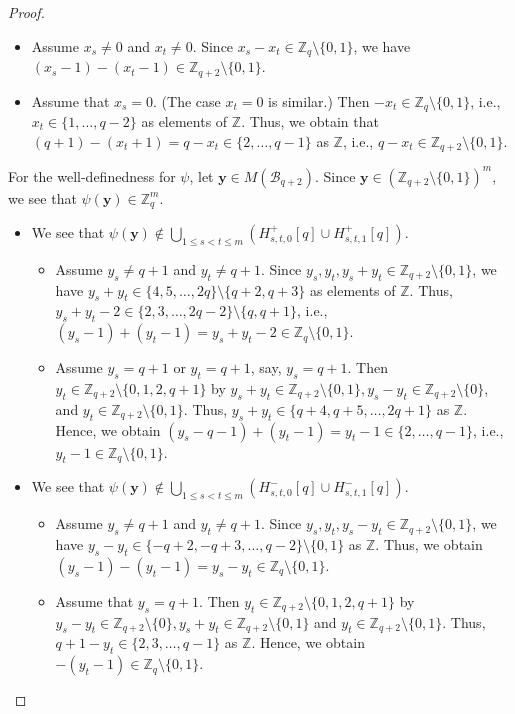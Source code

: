 \documentclass{article}
\theoremstyle{plain}
\theoremstyle{definition}
\theoremstyle{remark}
\numberwithin{equation}{section}
\newcommand{\Bc}{\mathcal{B}}
\newcommand{\ZZ}{\mathbb{Z}}
\begin{document}
\begin{proof}
\begin{itemize}
    \begin{itemize}
        \item Assume $x_s \neq 0$ and $x_t \neq 0$. 
        Since $x_s - x_t \in \ZZ_q \setminus \{0,1\}$, we have $(x_s - 1) - (x_t - 1) \in \ZZ_{q+2} \setminus \{0,1\}$. 
        \item Assume that $x_s = 0$. (The case $x_t=0$ is similar.) 
        Then $-x_t \in \ZZ_q \setminus \{0,1\}$, i.e., $x_t \in \{1,\ldots,q-2\}$ as elements of $\ZZ$. 
        Thus, we obtain that $(q+1) - (x_t + 1) = q - x_t \in \{2,\ldots,q-1\}$ as $\ZZ$, i.e., $q-x_t \in \ZZ_{q+2} \setminus \{0,1\}$.  
    \end{itemize}
\end{itemize}

\medskip

\noindent
For the well-definedness for $\psi$, let $\bm{y} \in M(\Bc_{q+2})$.
Since $\bm{y} \in (\ZZ_{q+2} \setminus \{0,1\})^m$, we see that $\psi(\bm{y}) \in \ZZ_q^m$.   
\begin{itemize}
\item We see that $\psi(\bm{y}) \notin \bigcup_{1 \leq s<t \leq m}(H_{s,t,0}^+[q] \cup H_{s,t,1}^+[q])$.
    \begin{itemize}
        \item Assume $y_s \neq q+1$ and $y_t \neq q+1$. Since $y_s,y_t,y_s+y_t \in \ZZ_{q+2} \setminus \{0,1\}$, 
        we have $y_s + y_t \in \{4,5,\ldots,2q\} \setminus \{q+2,q+3\}$ as elements of $\ZZ$. 
        Thus, $y_s + y_t - 2 \in \{2,3,\ldots,2q-2\} \setminus \{q,q+1\}$, i.e., $(y_s-1)+(y_t-1)=y_s + y_t - 2 \in \ZZ_q \setminus \{0,1\}$. 
        \item Assume $y_s=q+1$ or $y_t=q+1$, say, $y_s=q + 1$. Then $y_t \in \ZZ_{q+2} \setminus \{0,1,2,q+1\}$ by $y_s+y_t \in \ZZ_{q+2} \setminus \{0,1\}, y_s - y_t \in \ZZ_{q+2} \setminus \{0\}$, and $y_t \in \ZZ_{q+2} \setminus \{0,1\}$. 
        Thus, $y_s + y_t \in \{q+4,q+5,\ldots,2q+1\}$ as $\ZZ$. Hence, we obtain $(y_s-q-1)+(y_t - 1)=y_t-1 \in \{2,\ldots,q-1\}$, 
        i.e., $y_t-1 \in \ZZ_q \setminus \{0,1\}$. 
    \end{itemize}
\item We see that $\psi(\bm{y}) \notin \bigcup_{1 \leq s<t \leq m}(H_{s,t,0}^-[q] \cup H_{s,t,1}^-[q])$.
    \begin{itemize}
        \item Assume $y_s \neq q+1$ and $y_t \neq q+1$. Since $y_s,y_t,y_s - y_t \in \ZZ_{q+2} \setminus \{0,1\}$, 
        we have $y_s-y_t \in \{-q+2,-q+3,\ldots,q-2\} \setminus \{0,1\}$ as $\ZZ$. 
        Thus, we obtain $(y_s -1) - (y_t - 1) =y_s-y_t \in \ZZ_q \setminus \{0,1\}$. 
        \item Assume that $y_s = q+1$. %
        Then $y_t \in \ZZ_{q+2} \setminus \{0,1,2,q+1\}$ by $y_s - y_t \in \ZZ_{q+2} \setminus \{0\}, y_s + y_t \in \ZZ_{q+2} \setminus \{0,1\}$ and $y_t \in \ZZ_{q+2} \setminus \{0,1\}$. Thus, $q+1 - y_t \in \{2,3,\ldots,q-1\}$ as $\ZZ$. 
        Hence, we obtain $-(y_t - 1) \in \ZZ_q \setminus\{0,1\}$.
    \end{itemize}
\end{itemize}


\end{proof}
\end{document}
